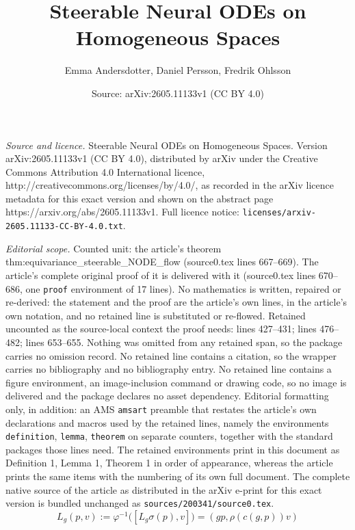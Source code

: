 \documentclass[10pt,a4paper]{amsart}
\title{Steerable Neural ODEs on Homogeneous Spaces}
\author{Emma Andersdotter, Daniel Persson, Fredrik Ohlsson}
\date{Source: arXiv:2605.11133v1 (CC BY 4.0)}
\begin{document}
\maketitle

\noindent\emph{Source and licence.} Steerable Neural ODEs on Homogeneous Spaces. Version arXiv:2605.11133v1 (CC BY 4.0), distributed by arXiv under the Creative Commons Attribution 4.0 International licence, http://creativecommons.org/licenses/by/4.0/, as recorded in the arXiv licence metadata for this exact version and shown on the abstract page https://arxiv.org/abs/2605.11133v1. Full licence notice: \texttt{licenses/arxiv-2605.11133-CC-BY-4.0.txt}.\par\smallskip

\noindent\textit{Editorial scope.} Counted unit: the article's theorem thm:equivariance\_steerable\_NODE\_flow (source0.tex lines 667--669). The article's complete original proof of it is delivered with it (source0.tex lines 670--686, one \texttt{proof} environment of 17 lines). No mathematics is written, repaired or re-derived: the statement and the proof are the article's own lines, in the article's own notation, and no retained line is substituted or re-flowed.  Retained uncounted as the source-local context the proof needs: lines 427--431; lines 476--482; lines 653--655.  Nothing was omitted from any retained span, so the package carries no omission record.  No retained line contains a citation, so the wrapper carries no bibliography and no bibliography entry.  No retained line contains a figure environment, an image-inclusion command or drawing code, so no image is delivered and the package declares no asset dependency.  Editorial formatting only, in addition: an AMS \texttt{amsart} preamble that restates the article's own declarations and macros used by the retained lines, namely the environments \texttt{definition}, \texttt{lemma}, \texttt{theorem} on separate counters, together with the standard packages those lines need.  The retained environments print in this document as Definition 1, Lemma 1, Theorem 1 in order of appearance, whereas the article prints the same items with the numbering of its own full document.  The complete native source of the article as distributed in the arXiv e-print for this exact version is bundled unchanged as \texttt{sources/200341/source0.tex}.
\begin{equation}\label{eq:left_action_on_M_times_V}
    L_g(p, v)
:= \varphi^{-1}\big([L_g \sigma(p), v]\big)
= (gp, \rho(c(g, p)) v)
\end{equation}
\end{document}

